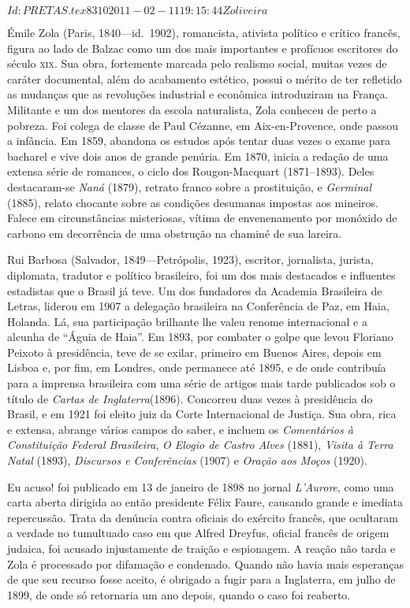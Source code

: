 \SVN $Id: PRETAS.tex 8310 2011-02-11 19:15:44Z oliveira $
\begin{resumopage}

\item[Émile Zola] (Paris, 1840---id.~1902), romancista, ativista político e
crítico francês, figura ao lado de Balzac como um dos mais importantes e
profícuos escritores do século \textsc{xix}. Sua obra, fortemente marcada pelo
realismo social, muitas vezes de caráter documental, além do acabamento
estético, possui o mérito de ter refletido as mudanças que as revoluções
industrial e econômica introduziram na França. Militante e um dos mentores da
escola naturalista, Zola conheceu de perto a pobreza. Foi colega de classe  de
Paul Cézanne, em Aix-en-Provence, onde passou a infância. Em 1859, abandona
os estudos após tentar duas vezes o exame para bacharel e vive dois anos de
grande penúria. Em 1870, inicia a redação de uma extensa série de romances, o
ciclo dos Rougon-Macquart (1871--1893). Deles destacaram-se \textit{Naná
}(1879), retrato franco sobre a prostituição, e \textit{Germinal} (1885),
relato chocante sobre as condições desumanas impostas aos mineiros.  Falece em
circunstâncias misteriosas, vítima de envenenamento por monóxido de carbono em
decorrência de uma obstrução na chaminé de sua lareira.

\item[Rui Barbosa] (Salvador, 1849---Petrópolis, 1923), escritor, jornalista,
jurista, diplomata, tradutor e político brasileiro, foi um dos mais destacados
e influentes estadistas que o Brasil já teve. Um dos fundadores da Academia
Brasileira de Letras, liderou em 1907 a delegação brasileira na Conferência de
Paz, em Haia, Holanda. Lá, sua participação brilhante lhe valeu renome
internacional e a alcunha de “Águia de Haia”. Em 1893, por combater o golpe que
levou Floriano Peixoto à presidência, teve de se exilar, primeiro em  Buenos
Aires, depois em Lisboa e, por fim, em Londres, onde permanece até 1895, e de
onde contribuía para a imprensa brasileira com uma série de artigos mais tarde
publicados sob o título de \textit{Cartas de Inglaterra}(1896). Concorreu duas
vezes à presidência do Brasil, e em 1921 foi eleito juiz da Corte Internacional
de Justiça. Sua obra, rica e extensa, abrange vários campos do saber, e incluem
os \textit{Comentários à Constituição Federal Brasileira}, \textit{O Elogio de
Castro Alves} (1881), \textit{Visita à Terra Natal} (1893), \textit{Discursos e
Conferências} (1907) e \textit{Oração aos Moços} (1920).

\item[Eu acuso!] foi publicado em 13 de janeiro de 1898 no jornal
\textit{L’Aurore}, como uma carta aberta dirigida ao então presidente Félix
Faure, causando grande e imediata repercussão. Trata da denúncia contra
oficiais do exército francês, que ocultaram a verdade no tumultuado caso em que
Alfred Dreyfus, oficial francês de origem judaica, foi acusado injustamente de
traição e espionagem. A reação não tarda e Zola é processado por difamação e
condenado. Quando não havia mais esperanças de que seu recurso fosse aceito, é
obrigado a fugir para a Inglaterra, em julho de 1899, de onde só retornaria um
ano depois, quando o caso foi reaberto.


\end{resumopage}
